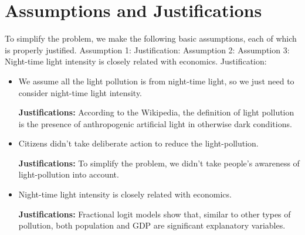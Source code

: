 \MinParskip{}
\section{Assumptions and Justifications} 
To simplify the problem, we make the following basic assumptions, each of which is properly justified.
Assumption 1: 
Justification: 
Assumption 2: 
Assumption 3: Night-time light intensity is closely related with economics.
Justification: 

\begin{itemize}
    \item We assume all the light pollution is from night-time light, so we just need to consider night-time light intensity.  

    \textbf{Justifications: }According to the Wikipedia\cite{wiki}, the definition of light pollution is the presence of anthropogenic artificial light in otherwise dark conditions. 

    \item Citizens didn't take deliberate action to reduce the light-pollution.
    
    \textbf{Justifications: }To simplify the problem, we didn't take people's awareness of light-pollution into account.

    \item Night-time light intensity is closely related with economics.
    
    \textbf{Justifications: }Fractional logit models\cite{fractional_logit_models} show that, similar to other types of pollution, both population and GDP are significant explanatory variables. 
\end{itemize}

